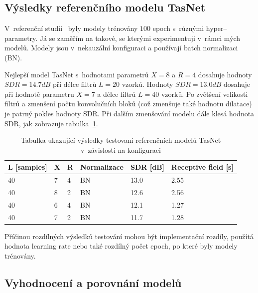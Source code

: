 \subsection{Výsledky referenčního modelu TasNet}

V~referenční studii~\cite{luo2018convtasnet} byly modely trénovány $100$ epoch s~různými hyper--parametry. Já se zaměřím na takové, se kterými experimentuji v~rámci mých modelů. Modely jsou v~nekauzální konfiguraci a používají batch normalizaci (BN).

Nejlepší model TasNet s~hodnotami parametrů $X=8$ a $R=4$ dosahuje hodnoty $SDR = 14.7 dB$ při délce filtrů $L = 20$ vzorků. Hodnoty $SDR = 13.0 dB$ dosahuje při hodnotě parametru $X = 7$ a délce filtrů $L = 40$ vzorků. Po zvětšení velikosti filtrů a zmenšení počtu konvolučních bloků (což zmenšuje také hodnotu dilatace) je patrný pokles hodnoty SDR. Při dalším zmenšování modelu dále klesá hodnota SDR, jak zobrazuje tabulka~\ref{tab:tasnet}.

\begin{table}[hbt]
\centering
\caption{Tabulka ukazující výsledky testovaní referenčních modelů TasNet v~závislosti na konfiguraci}
\label{tab:tasnet}
\begin{tabular}{|l|l|l|l|l|l|}
\hline
\textbf{L {[}samples{]}} & \textbf{X} & \textbf{R} & \textbf{Normalizace} & \textbf{SDR {[}dB{]}} & \textbf{Receptive field {[}s{]}} \\ \hline
40 & 7 & 4 & BN & 13.0 & 2.55 \\ \hline
40 & 8 & 2 & BN & 12.6 & 2.56 \\ \hline
40 & 6 & 4 & BN & 12.1 & 1.27 \\ \hline
40 & 7 & 2 & BN & 11.7 & 1.28 \\ \hline
\end{tabular}
\end{table}


Příčinou rozdílných výsledků testování mohou být implementační rozdíly, použítá hodnota learning rate nebo také rozdílný počet epoch, po které byly modely trénovány.



\subsection{Vyhodnocení a porovnání modelů}


